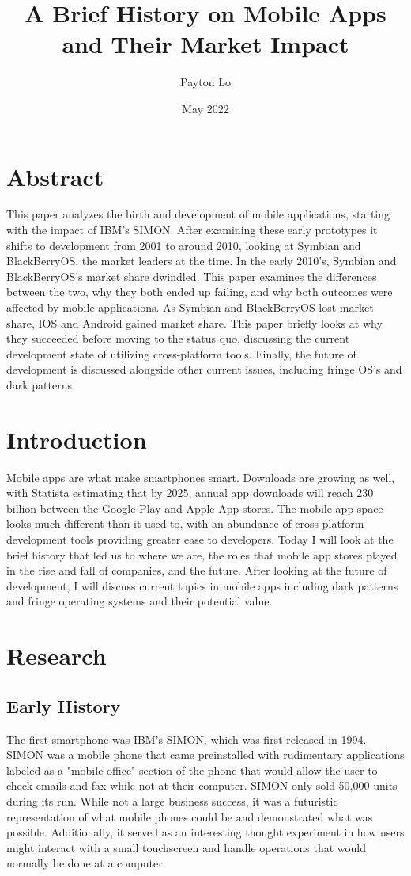 \documentclass{article}
\title{A Brief History on Mobile Apps and Their Market Impact}
\author{Payton Lo}
\date{May 2022}
\begin{document}
\maketitle

\section{Abstract}
\tab This paper analyzes the birth and development of mobile applications, starting with the impact of IBM's SIMON. After examining these early prototypes it shifts to development from 2001 to around 2010, looking at Symbian and BlackBerryOS, the market leaders at the time. In the early 2010's, Symbian and BlackBerryOS's market share dwindled. This paper examines the differences between the two, why they both ended up failing, and why both outcomes were affected by mobile applications. As Symbian and BlackBerryOS lost market share, IOS and Android gained market share. This paper briefly looks at why they succeeded before moving to the status quo, discussing the current development state of utilizing cross-platform tools. Finally, the future of development is discussed alongside other current issues, including fringe OS's and dark patterns.

\section{Introduction}
\tab Mobile apps are what make smartphones smart. Downloads are growing as well, with Statista estimating that by 2025, annual app downloads will reach 230 billion between the Google Play and Apple App stores.\cite{statista_2021} The mobile app space looks much different than it used to, with an abundance of cross-platform development tools providing greater ease to developers. Today I will look at the brief history that led us to where we are, the roles that mobile app stores played in the rise and fall of companies, and the future. After looking at the future of development, I will discuss current topics in mobile apps including dark patterns and fringe operating systems and their potential value.

\section{Research}
\subsection{Early History}
\tab The first smartphone was IBM's SIMON, which was first released in 1994. SIMON was a mobile phone that came preinstalled with rudimentary applications labeled as a "mobile office" section of the phone that would allow the user to check emails and fax while not at their computer.\cite{buxtoncollection} SIMON only sold 50,000 units during its run.\cite{aamoth_2014} While not a large business success, it was a futuristic representation of what mobile phones could be and demonstrated what was possible. Additionally, it served as an interesting thought experiment in how users might interact with a small touchscreen and handle operations that would normally be done at a computer.
\end{document}

